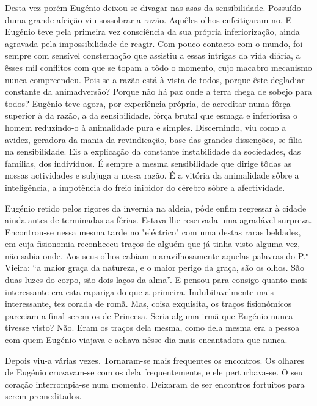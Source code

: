 \documentclass[9pt]{article}
\begin{document}
Desta vez porém Eugé\-nio deixou-se divagar nas asas da sensibilidade. Possuído duma gran\-de afei\-ção viu sossobrar a razão. Aquêles o\-lhos
enfeitiçaram-no. E Eugé\-nio teve pela primeira vez consciência da sua
própria inferioriza\-ção, ainda agravada pela impossibilidade de reagir.
Com pouco contacto com o mundo, foi sempre com sensível consterna\-ção
que assistiu a essas intrigas da vida diária, a êsses mil conflitos
com que se topam a tôdo o momento, cujo macabro mecanismo nunca compreendeu. Pois se a razão está à vista de todos, porque êste degladiar constante da animadversão? Porque não há paz onde a terra chega de sobejo
para todos? Eugé\-nio teve agora, por experiência própria, de acreditar
numa fôrça superior à da razão, a da sensibilidade, fôrça brutal que
esmaga e inferioriza o homem reduzindo-o à animalidade pura e simples.
Discernindo, viu como a avidez, geradora da mania da revindica\-ção, base das gran\-des dissen\-ções, se filia na sensibilidade. Eis a explica\-ção da constante instabilidade da sociedades, das fa\-mí\-lias, dos indivíduos. É sempre a mesma sensibilidade que dirige tôdas as nossas actividades e subjuga a nossa razão. É a vitória da animalidade sôbre a
inteligência, a impotência do freio inibidor do cérebro sôbre a afectividade.

Eugé\-nio retido pelos rigores da invernia na aldeia, pôde enfim
regressar à cidade ainda antes de terminadas as férias. Estava-\-lhe
reservada uma a\-gra\-dá\-vel surpreza. Encontrou-se nessa mesma tarde no
"eléctrico" com uma destas raras beldades, em cuja fisionomia reconheceu traços de alguém que já tinha visto alguma vez, não sabia onde.
Aos seus o\-lhos cabiam maravi\-lhosamente aquelas palavras do P.$^{\mbox{\tiny e}}$ Vieira: ``a maior graça da natureza, e o maior perigo da graça,
são os o\-lhos. São duas luzes do corpo, são dois laços da alma''.
E pensou para consigo quanto mais interessante era esta rapariga do
que a primeira. Indubitavelmente mais interessante, tez corada de romã. Mas, coisa exquisita, os traços fisionómicos pareciam a final serem
os de Princesa. Seria alguma irmã que Eugé\-nio nunca tivesse visto?
Não. Eram os traços dela mesma, como dela mesma era a pessoa com
quem Eugé\-nio viajava e achava nêsse dia mais encantadora que nunca.

Depois viu-a várias vezes. Tornaram-se mais frequentes os encontros. Os o\-lhares de Eugé\-nio cruzavam-se com os dela frequentemente,
e ele perturbava-se. O seu cora\-ção interrompia-se num momento. Deixaram de ser encontros fortuitos para serem premeditados.
\end{document}
